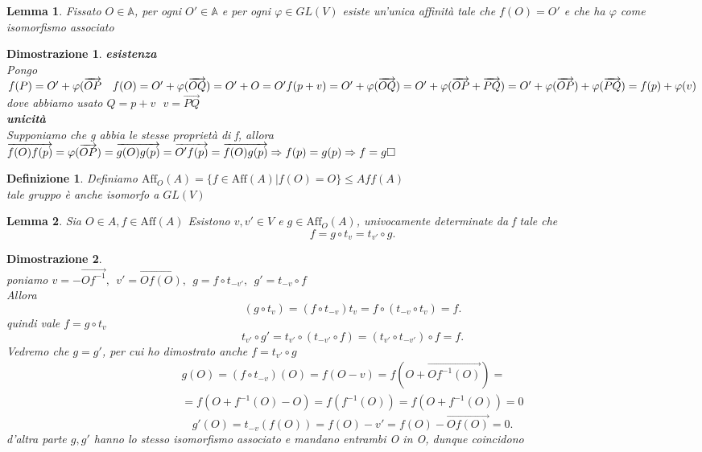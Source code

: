 \documentclass[12px]{article}
\theoremstyle{break}
\theoremstyle{break}
\newtheorem{lemma}{Lemma}
\theoremstyle{break}
\newtheorem{defin}{Definizione}
\theoremstyle{break}
\theoremstyle{break}
\newtheorem*{dimo}{Dimostrazione}
\theoremstyle{break}
\newenvironment{lemm}
  {\begin{mdframed}\begin{lemma}}
  {\end{lemma}\end{mdframed}}
\newenvironment{defi}
  {\begin{mdframed}\begin{defin}}
  {\end{defin}\end{mdframed}}
\begin{document}
\begin{lemm}
	Fissato $O\in \mathbb{A} $, per ogni $O'\in \mathbb{A} $ e per ogni $ \varphi\in GL(V) $ esiste un'unica affinità tale che $f(O) = O'$ e che ha $ \varphi$ come isomorfismo associato
\end{lemm}
\begin{dimo}
	\textbf{esistenza}\\
	Pongo $f(P) = O' + \varphi(\overrightarrow{OP} \ \ \ f(O) = O' + \varphi(\overrightarrow{OQ}) = O' + O = O'\\
	f(p + v) = O' + \varphi(\overrightarrow{OQ}) = O' + \varphi(\overrightarrow{OP} + \overrightarrow{PQ}) = O' + \varphi(\overrightarrow{OP}) + \varphi(\overrightarrow{PQ}) = f(p) + \varphi(v)$\\
	dove abbiamo usato $Q = p + v \ \ \ v = \overrightarrow{PQ}$\\
	\textbf{unicità}\\
	Supponiamo che g abbia le stesse proprietà di f, allora \\
	$\overrightarrow{f(O)f(p)} = \varphi(\overrightarrow{OP}) = \overrightarrow{g(O)g(p)} = \overrightarrow{O'f(p)} = \overrightarrow{f(O)g(p)} \Rightarrow f(p) = g(p)\\ \Rightarrow  f = g \hfill\square$
\end{dimo}
\begin{defi}
	Definiamo 
	$\text{Aff}_O(A) = \{f\in \text{Aff}(A) | f(O) = O\} \leq Aff(A)$\\
	tale gruppo è anche isomorfo a $GL(V)$
\end{defi}
\begin{lemm}
	Sia $O\in A, f \in\text{Aff}(A)$ Esistono $v,v'\in V$ e $g\in\text{Aff}_O(A)$, univocamente determinate da f tale che
	\[
		f = g \circ t_v = t_{v'}\circ g
	.\] 
\end{lemm}
\begin{dimo}\ \\
	poniamo $v = -\overrightarrow{Of^{-1}}, \ \ v' = \overrightarrow{Of(O)}, \ \  g = f\circ t_{-v'}, \ \  g' = t_{-v}\circ f$ \\
	Allora
	\[
		(g \circ t_v) = (f\circ t_{-v})t_v = f\circ(t_{-v}\circ t_v) = f
	.\] 
	quindi vale $f = g\circ t_v$
	\[
		t_{v'}\circ g' = t_{v'}\circ (t_{-v'}\circ f) = (t_{v'}\circ t_{-v'})\circ f = f
	.\] 
	Vedremo che $g = g'$, per cui ho dimostrato anche $f = t_{v'}\circ g$ \\
	\begin{gather*}
		g(O) = (f\circ t_{-v})(O) = f(O-v) = f(O + \overrightarrow{Of^{-1}(O)}) = \\ = f(O + f^{-1}(O) - O) = f(f^{-1}(O)) = f(O + f^{-1}(O)) = 0
	\end{gather*}
	\[
		g'(O) = t_{-v}(f(O)) = f(O) - v' = f(O) - \overrightarrow{Of(O)} = 0
	.\]
	d'altra parte $g, g'$ hanno lo stesso isomorfismo associato e mandano entrambi O in O, dunque coincidono
\end{dimo}
\end{document}
